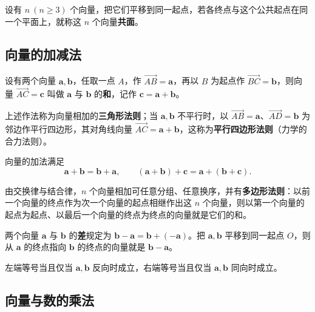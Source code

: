 设有 $n\ (n\ge3)$ 个向量，把它们平移到同一起点，若各终点与这个公共起点在同一个平面上，就称这 $n$ 个向量\textbf{共面}。

\subsection{向量的加减法}

\begin{definition}[向量的加法]
设有两个向量 $\boldsymbol{a},\boldsymbol{b}$，任取一点 $A$，作 $\overrightarrow{AB}=\boldsymbol{a}$，再以 $B$ 为起点作 $\overrightarrow{BC}=\boldsymbol{b}$，则向量 $\overrightarrow{AC}=\boldsymbol{c}$ 叫做 $\boldsymbol{a}$ 与 $\boldsymbol{b}$ 的\textbf{和}，记作 $\boldsymbol{c}=\boldsymbol{a}+\boldsymbol{b}$。
\end{definition}

上述作法称为向量相加的\textbf{三角形法则}；当 $\boldsymbol{a},\boldsymbol{b}$ 不平行时，以 $\overrightarrow{AB}=\boldsymbol{a}$、$\overrightarrow{AD}=\boldsymbol{b}$ 为邻边作平行四边形，其对角线向量 $\overrightarrow{AC}=\boldsymbol{a}+\boldsymbol{b}$，这称为\textbf{平行四边形法则}（力学的合力法则）。

\begin{theorem}
向量的加法满足
\[
\boldsymbol{a}+\boldsymbol{b}=\boldsymbol{b}+\boldsymbol{a},\qquad
(\boldsymbol{a}+\boldsymbol{b})+\boldsymbol{c}=\boldsymbol{a}+(\boldsymbol{b}+\boldsymbol{c}).
\]
\end{theorem}

由交换律与结合律，$n$ 个向量相加可任意分组、任意换序，并有\textbf{多边形法则}：以前一个向量的终点作为次一个向量的起点相继作出这 $n$ 个向量，则以第一个向量的起点为起点、以最后一个向量的终点为终点的向量就是它们的和。

两个向量 $\boldsymbol{a}$ 与 $\boldsymbol{b}$ 的\textbf{差}规定为 $\boldsymbol{b}-\boldsymbol{a}=\boldsymbol{b}+(-\boldsymbol{a})$。把 $\boldsymbol{a},\boldsymbol{b}$ 平移到同一起点 $O$，则从 $\boldsymbol{a}$ 的终点指向 $\boldsymbol{b}$ 的终点的向量就是 $\boldsymbol{b}-\boldsymbol{a}$。


左端等号当且仅当 $\boldsymbol{a},\boldsymbol{b}$ 反向时成立，右端等号当且仅当 $\boldsymbol{a},\boldsymbol{b}$ 同向时成立。

\subsection{向量与数的乘法}

